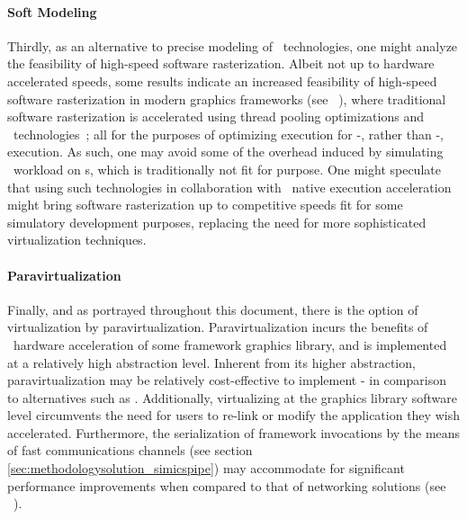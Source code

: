 \paragraph{Soft Modeling}
\label{par:background_graphicsvirtualization_softmodeling}
Thirdly, as an alternative to precise modeling of \dvttermgpu\ technologies, one might analyze the feasibility of high-speed software rasterization.
Albeit not up to hardware accelerated speeds, some results indicate an increased feasibility of high-speed software rasterization in modern graphics frameworks (see ~), where traditional software rasterization is accelerated using thread pooling optimizations and \dvttermsimd\ technologies~; all for the purposes of optimizing execution for \dvttermcpu -, rather than \dvttermgpu -, execution.
As such, one may avoid some of the overhead induced by simulating \dvttermgpu\ workload on \dvttermcpu s, which is traditionally not fit for purpose.
One might speculate that using such technologies in collaboration with \dvttermhost\ native execution acceleration might bring software rasterization up to competitive speeds fit for some simulatory development purposes, replacing the need for more sophisticated virtualization techniques.

\paragraph{Paravirtualization}
\label{par:background_graphicsvirtualization_paravirtualization}
Finally, and as portrayed throughout this document, there is the option of virtualization by paravirtualization.
Paravirtualization incurs the benefits of \dvttermhost\ hardware acceleration of some framework graphics library, and is implemented at a relatively high abstraction level. %
Inherent from its higher abstraction, paravirtualization may be relatively cost-effective to implement - in comparison to alternatives such as .
Additionally, virtualizing at the graphics library software level circumvents the need for users to re-link or modify the application they wish accelerated.
Furthermore, the serialization of framework invocations by the means of fast communications channels (see section \ref{sec:methodologysolution_simicspipe}) may accommodate for significant performance improvements when compared to that of networking solutions (see ~).

